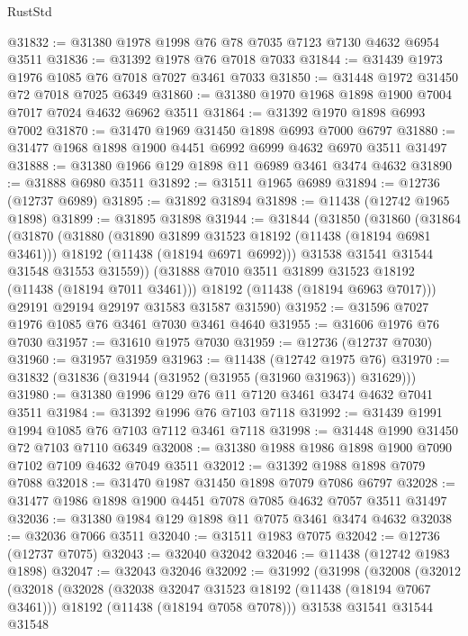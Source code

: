 \begin{lexlean}{RustStd}
\begin{coremodule}
@31832 := @31380 @1978 @1998 @76 @78 @7035 @7123 @7130 @4632 @6954 @3511
@31836 := @31392 @1978 @76 @7018 @7033
@31844 := @31439 @1973 @1976 @1085 @76 @7018 @7027 @3461 @7033
@31850 := @31448 @1972 @31450 @72 @7018 @7025 @6349
@31860 := @31380 @1970 @1968 @1898 @1900 @7004 @7017 @7024 @4632 @6962 @3511
@31864 := @31392 @1970 @1898 @6993 @7002
@31870 := @31470 @1969 @31450 @1898 @6993 @7000 @6797
@31880 := @31477 @1968 @1898 @1900 @4451 @6992 @6999 @4632 @6970 @3511 @31497
@31888 := @31380 @1966 @129 @1898 @11 @6989 @3461 @3474 @4632
@31890 := @31888 @6980 @3511
@31892 := @31511 @1965 @6989
@31894 := @12736 (@12737 @6989)
@31895 := @31892 @31894
@31898 := @11438 (@12742 @1965 @1898)
@31899 := @31895 @31898
@31944 := @31844
    (@31850
      (@31860
        (@31864
          (@31870
            (@31880
              (@31890 @31899 @31523 @18192 (@11438 (@18194 @6981 @3461)))
              @18192
              (@11438 (@18194 @6971 @6992)))
            @31538
            @31541
            @31544
            @31548
            @31553
            @31559))
        (@31888 @7010 @3511 @31899 @31523 @18192 (@11438 (@18194 @7011 @3461)))
        @18192
        (@11438 (@18194 @6963 @7017)))
      @29191
      @29194
      @29197
      @31583
      @31587
      @31590)
@31952 := @31596 @7027 @1976 @1085 @76 @3461 @7030 @3461 @4640
@31955 := @31606 @1976 @76 @7030
@31957 := @31610 @1975 @7030
@31959 := @12736 (@12737 @7030)
@31960 := @31957 @31959
@31963 := @11438 (@12742 @1975 @76)
@31970 := @31832 (@31836 (@31944 (@31952 (@31955 (@31960 @31963)) @31629)))
@31980 := @31380 @1996 @129 @76 @11 @7120 @3461 @3474 @4632 @7041 @3511
@31984 := @31392 @1996 @76 @7103 @7118
@31992 := @31439 @1991 @1994 @1085 @76 @7103 @7112 @3461 @7118
@31998 := @31448 @1990 @31450 @72 @7103 @7110 @6349
@32008 := @31380 @1988 @1986 @1898 @1900 @7090 @7102 @7109 @4632 @7049 @3511
@32012 := @31392 @1988 @1898 @7079 @7088
@32018 := @31470 @1987 @31450 @1898 @7079 @7086 @6797
@32028 := @31477 @1986 @1898 @1900 @4451 @7078 @7085 @4632 @7057 @3511 @31497
@32036 := @31380 @1984 @129 @1898 @11 @7075 @3461 @3474 @4632
@32038 := @32036 @7066 @3511
@32040 := @31511 @1983 @7075
@32042 := @12736 (@12737 @7075)
@32043 := @32040 @32042
@32046 := @11438 (@12742 @1983 @1898)
@32047 := @32043 @32046
@32092 := @31992
    (@31998
      (@32008
        (@32012
          (@32018
            (@32028
              (@32038 @32047 @31523 @18192 (@11438 (@18194 @7067 @3461)))
              @18192
              (@11438 (@18194 @7058 @7078)))
            @31538
            @31541
            @31544
            @31548

\end{coremodule}
\end{lexlean}
